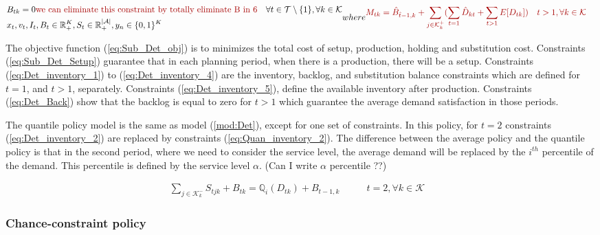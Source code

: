 \documentclass[10pt]{article}
\newcommand{\ti}{t} %
\newcommand{\TI}{\mathcal{T}}
\newcommand{\ka}{k} %
\newcommand{\KA}{\mathcal{K}}
\newcommand{\Ka}{K}
\newcommand{\jey}{j} %
\newcommand{\Graf}{\mathcal{A}} %
\newcommand{\Bi}{B} %
\newcommand{\Csub}{\mathcal{K}^+_k}
\newcommand{\Psub}{\mathcal{K}^-_k}
\newcommand{\tAct}{\hat{\ti}} %
\newcommand{\cred}{\color{red!65!black}}
\begin{document}
\begin{subequations}
\begin{flalign}
&\Bi_{\ti \ka} =0 {\cred\text{we can eliminate this constraint by totally eliminate B in 6}}& \forall \ti \in \TI \setminus\{1\}, \forall \ka \in \KA &\label{eq:Det_Back}\\
&  {x}_{ \ti },  {v}_{ \ti },  {I}_{ \ti} , {\Bi}_{ \ti } \in \mathbb{R}_{+}^{\Ka} , {S}_{\ti} \in \mathbb{R}_{+}^{|\Graf|} ,{y}_{ n } \in \{0,1\}^{\Ka} &    & \label{eq:Sub_FD_bound2}
\end{flalign}
where
{\cred{
\begin{flalign}
  &  M_{\ti \ka} = \hat{B}_{\tAct-1, \ka}+ \sum_{\jey \in  \Csub}( \sum_{t = 1}{\hat{D}}_{kt} + \sum_{\ti >1}E[{D}_{\ti \ka}])  &\ti> 1 ,\forall \ka \in \KA  &  
  \notag
  \end{flalign}}}
\end{subequations}

The objective function (\ref{eq:Sub_Det_obj}) is to minimizes the total cost of setup, production, holding and substitution cost. Constraints (\ref{eq:Sub_Det_Setup}) guarantee that in each planning period, when there is a production, there will be a setup. Constraints (\ref{eq:Det_inventory_1}) to (\ref{eq:Det_inventory_4}) are the inventory, backlog, and substitution balance constraints which are defined for $\ti=1$, and $\ti > 1$, separately. Constraints (\ref{eq:Det_inventory_5}), define the available inventory after production. Constraints (\ref{eq:Det_Back}) show that the backlog is equal to zero for $\ti > 1 $ which guarantee the average demand satisfaction in those periods.

The quantile policy model is the same as model (\ref{mod:Det}), except for one set of constraints. In this policy, for $\ti =2$ constraints (\ref{eq:Det_inventory_2}) are replaced by constraints (\ref{eq:Quan_inventory_2}). The difference between the average policy and the quantile policy is that in the second period, where we need to consider the service level, the average demand will be replaced by the $i^{th}$ percentile of the demand. This percentile is defined by the service level $\alpha$. {\cred(Can I write  $\alpha$ percentile ??)} 

\begin{align}
     \sum_{\jey \in  \Psub} {S}_{\ti \jey \ka} + B_{\ti \ka} = \mathbb{Q}_{i}({D}_{\ti \ka}) + {B}_{\ti-1 , \ka} & \quad \quad \ti = 2,\forall \ka \in \KA & \label{eq:Quan_inventory_2} 
\end{align}

\subsubsection{Chance-constraint policy}
\end{document}
